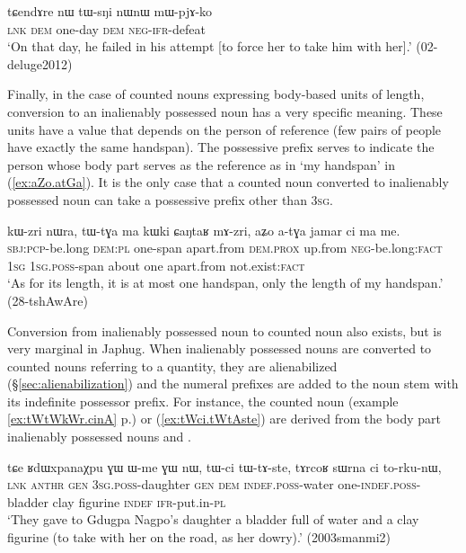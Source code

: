 \begin{exe}
\ex \label{ex:nW.tWsNi}
\gll tɕendɤre nɯ tɯ-sŋi nɯnɯ mɯ-pjɤ-ko \\
\textsc{lnk} \textsc{dem} one-day \textsc{dem} \textsc{neg}-\textsc{ifr}-defeat \\
\glt `On that day, he failed in his attempt [to force her to take him with her].' (02-deluge2012)
\end{exe}

Finally, in the case of counted nouns expressing body-based units of length, conversion to an inalienably possessed noun has a very specific meaning.  These units have a value that depends on the person of reference (few pairs of people have exactly the same handspan). The possessive prefix serves to indicate the person whose body part serves as the reference as in  `my handspan' in (\ref{ex:aZo.atGa}). It is the only case that a counted noun converted to inalienably possessed noun can take a possessive prefix other than \textsc{3sg}.

\begin{exe}
\ex \label{ex:aZo.atGa}
\gll kɯ-zri nɯra, tɯ-tɣa ma kɯki ɕaŋtaʁ mɤ-zri, aʑo a-tɣa jamar ci ma me. \\
 \textsc{sbj}:\textsc{pcp}-be.long \textsc{dem}:\textsc{pl} one-span apart.from \textsc{dem}.\textsc{prox} up.from \textsc{neg}-be.long:\textsc{fact} \textsc{1sg} \textsc{1sg}.\textsc{poss}-span about one apart.from not.exist:\textsc{fact} \\
\glt `As for its length, it is at most one handspan, only the length of my handspan.' (28-tshAwAre)
\end{exe}

Conversion from inalienably possessed noun to counted noun also exists, but is very marginal in Japhug. When inalienably possessed nouns are converted to counted nouns referring to a quantity, they are alienabilized (§\ref{sec:alienabilization}) and the numeral prefixes are added to the noun stem with its indefinite possessor prefix. For instance, the counted noun  (example \ref{ex:tWtWkWr.cinA} p.\pageref{ex:tWtWkWr.cinA}) or  (\ref{ex:tWci.tWtAste}) are derived from the body part inalienably possessed nouns  and . 

\begin{exe}
\ex \label{ex:tWci.tWtAste}
\gll  tɕe ʁdɯxpanaχpu ɣɯ ɯ-me ɣɯ nɯ, tɯ-ci tɯ-tɤ-ste, tɤrcoʁ sɯrna ci to-rku-nɯ, \\
 \textsc{lnk}  \textsc{anthr} \textsc{gen} \textsc{3sg}.\textsc{poss}-daughter \textsc{gen} \textsc{dem} \textsc{indef}.\textsc{poss}-water one-\textsc{indef}.\textsc{poss}-bladder clay figurine \textsc{indef} \textsc{ifr}-put.in-\textsc{pl} \\
\glt `They gave to Gdugpa Nagpo's daughter a bladder full of water and a clay figurine (to take with her on the road, as her dowry).' (2003smanmi2)
\end{exe}

